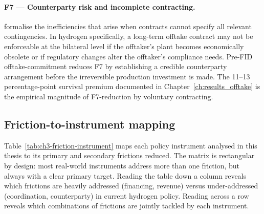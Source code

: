 \paragraph{F7 --- Counterparty risk and incomplete contracting.} \cite{grossman1986costs} formalise the inefficiencies that arise when contracts cannot specify all relevant contingencies. In hydrogen specifically, a long-term offtake contract may not be enforceable at the bilateral level if the offtaker's plant becomes economically obsolete or if regulatory changes alter the offtaker's compliance needs. Pre-FID offtake-commitment reduces F7 by establishing a credible counterparty arrangement before the irreversible production investment is made. The 11--13 percentage-point survival premium documented in Chapter~\ref{ch:results_offtake} is the empirical magnitude of F7-reduction by voluntary contracting.

\subsection{Friction-to-instrument mapping}
\label{sec:ch3-friction-mapping}

Table~\ref{tab:ch3-friction-instrument} maps each policy instrument analysed in this thesis to its primary and secondary frictions reduced. The matrix is rectangular by design: most real-world instruments address more than one friction, but always with a clear primary target. Reading the table down a column reveals which frictions are heavily addressed (financing, revenue) versus under-addressed (coordination, counterparty) in current hydrogen policy. Reading across a row reveals which combinations of frictions are jointly tackled by each instrument.

